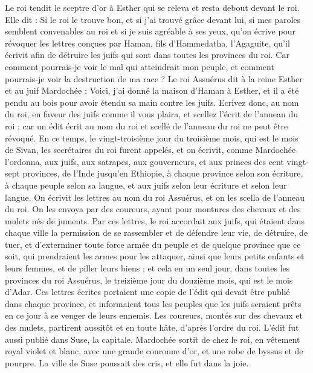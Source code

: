 \begin{multicols}{2}
Le roi tendit le sceptre d'or à Esther qui se releva et resta debout devant le roi.
Elle dit : Si le roi le trouve bon, et si j'ai trouvé grâce devant lui, si mes paroles semblent convenables au roi et si je suis agréable à ses yeux, qu'on écrive pour révoquer les lettres conçues par Haman, fils d'Hammedatha, l’Agaguite, qu'il écrivit afin de détruire les juifs qui sont dans toutes les provinces du roi.
Car comment pourrais-je voir le mal qui atteindrait mon peuple, et comment pourrais-je voir la destruction de ma race ?
Le roi Assuérus dit à la reine Esther et au juif Mardochée : Voici, j'ai donné la maison d'Haman à Esther, et il a été pendu au bois pour avoir étendu sa main contre les juifs.
Ecrivez donc, au nom du roi, en faveur des juifs comme il vous plaira, et scellez l'écrit de l'anneau du roi ; car un édit écrit au nom du roi et scellé de l'anneau du roi ne peut être révoqué.
En ce temps, le vingt-troisième jour du troisième mois, qui est le mois de Sivan, les secrétaires du roi furent appelés, et on écrivit, comme Mardochée l’ordonna, aux juifs, aux satrapes, aux gouverneurs, et aux princes des cent vingt-sept provinces, de l’Inde jusqu'en Ethiopie, à chaque province selon son écriture, à chaque peuple selon sa langue, et aux juifs selon leur écriture et selon leur langue.
On écrivit les lettres au nom du roi Assuérus, et on les scella de l'anneau du roi. On les envoya par des coureurs, ayant pour montures des chevaux et des mulets nés de juments.
Par ces lettres, le roi accordait aux juifs, qui étaient dans chaque ville la permission de se rassembler et de défendre leur vie, de détruire, de tuer, et d’exterminer toute force armée du peuple et de quelque province que ce soit, qui prendraient les armes pour les attaquer, ainsi que leurs petits enfants et leurs femmes, et de piller leurs biens ;
et cela en un seul jour, dans toutes les provinces du roi Assuérus, le treizième jour du douzième mois, qui est le mois d'Adar.
Ces lettres écrites portaient une copie de l’édit qui devait être publié dans chaque province, et informaient tous les peuples que les juifs seraient prêts en ce jour à se venger de leurs ennemis.
Les coureurs, montés sur des chevaux et des mulets, partirent aussitôt et en toute hâte, d’après l’ordre du roi. L'édit fut aussi publié dans Suse, la capitale.
Mardochée sortit de chez le roi, en vêtement royal violet et blanc, avec une grande couronne d'or, et une robe de byssus et de pourpre. La ville de Suse poussait des cris, et elle fut dans la joie.

\end{multicols}
